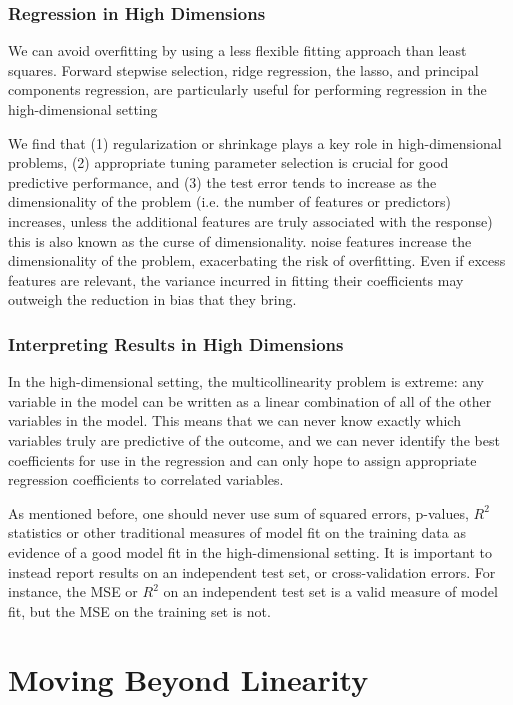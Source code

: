 \documentclass{article}
\numberwithin{equation}{section}
\begin{document}
\begin{enumerate}
\subsubsection{Regression in High Dimensions}

We can avoid overfitting by using a less flexible fitting approach
than least squares. Forward stepwise selection, ridge
regression, the lasso, and principal components regression, are particularly useful for performing regression in the high-dimensional setting

We find that (1) regularization or shrinkage plays a key role in high-dimensional problems, (2) appropriate tuning parameter selection is crucial for good predictive performance, and (3) the test error tends to increase as the dimensionality of the problem
(i.e. the number of features or predictors) increases, unless the additional features are truly associated with the response) this is also known as the curse of dimensionality. noise features increase the dimensionality of the problem, exacerbating the risk of overfitting.  Even if excess features are relevant, the variance incurred in fitting their coefficients may outweigh the reduction in bias that they bring.


\subsubsection{Interpreting Results in High Dimensions}
In the high-dimensional setting, the multicollinearity problem is extreme: any variable in the model can be written as a linear combination of all of the other variables in the model. This
means that we can never know exactly which variables truly are predictive of the outcome, and we can never identify the best coefficients for use in the regression and can only hope to assign appropriate regression coefficients to correlated variables.

As mentioned before, one should never use sum of squared errors, p-values, $R^2$ statistics  or other traditional measures of model fit on the training data as evidence of a good model fit in the high-dimensional setting. It is important to instead report results on an independent test set, or cross-validation errors. For instance, the MSE or $R^2$ on an independent test set is a valid measure of model fit, but the MSE on the training set is not.



\newpage
\section{Moving Beyond Linearity}


\end{enumerate}
\end{document}
